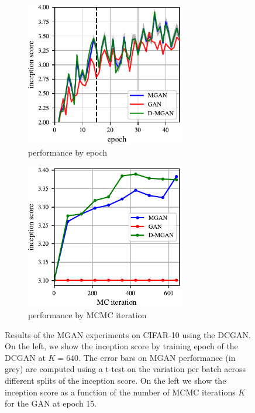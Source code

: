 \documentclass{article}
\begin{document}
\begin{figure}
    \centering
    \begin{subfigure}[b]{0.49\textwidth}
       \centering
       \includegraphics[width=2.75in]{figures/base_iso.pdf}
       \caption{performance by epoch}
       \label{fig:incep_by_epoch}
    \end{subfigure}
    \begin{subfigure}[b]{0.49\textwidth}
       \centering
       \includegraphics[width=2.75in]{figures/plot_per_mh.pdf}
       \caption{performance by MCMC iteration}
       \label{fig:incep_by_iter}
    \end{subfigure}
    \caption{{\small
    Results of the MGAN experiments on CIFAR-10 using the DCGAN\@.
    On the left, we show the inception score by training epoch of the DCGAN at $K=640$.
    The error bars on MGAN performance (in grey) are computed using a t-test on the variation per batch across different splits of the inception score.
    On the left we show the inception score as a function of the number of MCMC iterations $K$ for the GAN at epoch 15.
    }}
\end{figure}

\end{document}
